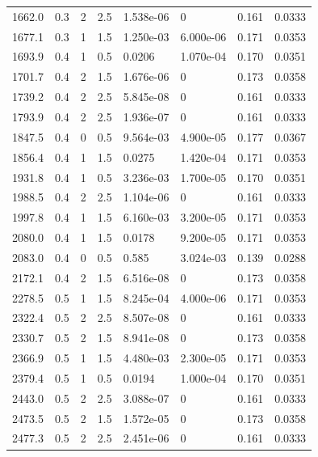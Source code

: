 \documentclass[preview]{standalone}
\begin{document}
{{\begin{tabular}{L{1.2cm}C{1.2cm} C{0.3cm}C{0.5cm} C{1.4cm}C{1.4cm} C{1.4cm}C{1.4cm}}
  1662.0  &   0.3  & 2     & 2.5 &  1.538e-06  & 0  & 0.161 &  0.0333   \\ 
  1677.1  &   0.3  & 1     & 1.5 &  1.250e-03  & 6.000e-06  & 0.171 &  0.0353   \\ 
  1693.9  &   0.4  & 1     & 0.5 &  0.0206  & 1.070e-04  & 0.170 &  0.0351   \\ 
  1701.7  &   0.4  & 2     & 1.5 &  1.676e-06  & 0  & 0.173 &  0.0358   \\ 
  1739.2  &   0.4  & 2     & 2.5 &  5.845e-08  & 0  & 0.161 &  0.0333   \\ 
  1793.9  &   0.4  & 2     & 2.5 &  1.936e-07  & 0  & 0.161 &  0.0333   \\ 
  1847.5  &   0.4  & 0     & 0.5 &  9.564e-03  & 4.900e-05  & 0.177 &  0.0367   \\ 
  1856.4  &   0.4  & 1     & 1.5 &  0.0275  & 1.420e-04  & 0.171 &  0.0353   \\ 
  1931.8  &   0.4  & 1     & 0.5 &  3.236e-03  & 1.700e-05  & 0.170 &  0.0351   \\ 
  1988.5  &   0.4  & 2     & 2.5 &  1.104e-06  & 0  & 0.161 &  0.0333   \\ 
  1997.8  &   0.4  & 1     & 1.5 &  6.160e-03  & 3.200e-05  & 0.171 &  0.0353   \\ 
  2080.0  &   0.4  & 1     & 1.5 &  0.0178  & 9.200e-05  & 0.171 &  0.0353   \\ 
  2083.0  &   0.4  & 0     & 0.5 &  0.585  & 3.024e-03  & 0.139 &  0.0288   \\ 
  2172.1  &   0.4  & 2     & 1.5 &  6.516e-08  & 0  & 0.173 &  0.0358   \\ 
  2278.5  &   0.5  & 1     & 1.5 &  8.245e-04  & 4.000e-06  & 0.171 &  0.0353   \\ 
  2322.4  &   0.5  & 2     & 2.5 &  8.507e-08  & 0  & 0.161 &  0.0333   \\ 
  2330.7  &   0.5  & 2     & 1.5 &  8.941e-08  & 0  & 0.173 &  0.0358   \\ 
  2366.9  &   0.5  & 1     & 1.5 &  4.480e-03  & 2.300e-05  & 0.171 &  0.0353   \\ 
  2379.4  &   0.5  & 1     & 0.5 &  0.0194  & 1.000e-04  & 0.170 &  0.0351   \\ 
  2443.0  &   0.5  & 2     & 2.5 &  3.088e-07  & 0  & 0.161 &  0.0333   \\ 
  2473.5  &   0.5  & 2     & 1.5 &  1.572e-05  & 0  & 0.173 &  0.0358   \\ 
  2477.3  &   0.5  & 2     & 2.5 &  2.451e-06  & 0  & 0.161 &  0.0333   \\ 

\end{tabular}}}
\end{document}
